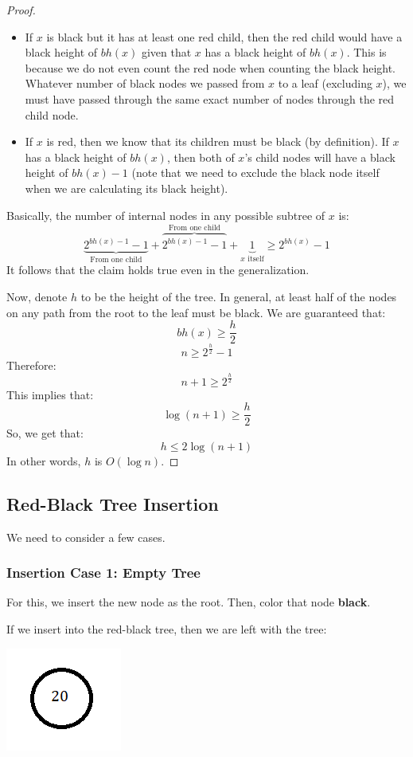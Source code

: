 \documentclass[letterpaper]{article}
\begin{document}
\begin{mdframed}
\begin{proof}
\begin{itemize}
\begin{itemize}
                \item If $x$ is black but it has at least one red child, then the red child would have a black height of $bh(x)$ given that $x$ has a black height of $bh(x)$. This is because we do not even count the red node when counting the black height. Whatever number of black nodes we passed from $x$ to a leaf (excluding $x$), we must have passed through the same exact number of nodes through the red child node.
                \item If $x$ is red, then we know that its children must be black (by definition). If $x$ has a black height of $bh(x)$, then both of $x$'s child nodes will have a black height of $bh(x) - 1$ (note that we need to exclude the black node itself when we are calculating its black height). 
            \end{itemize}
            Basically, the number of internal nodes in any possible subtree of $x$ is:
            \[\underbrace{2^{bh(x) - 1} - 1}_{\text{From one child}} + \overbrace{2^{bh(x) - 1} - 1}^{\text{From one child}} + \underbrace{1}_{x \text{ itself}} \geq 2^{bh(x)} - 1\]
            It follows that the claim holds true even in the generalization.  
        \end{itemize}
        Now, denote $h$ to be the height of the tree. In general, at least half of the nodes on any path from the root to the leaf must be black. We are guaranteed that: 
        \[bh(x) \geq \frac{h}{2}\]
        \[n \geq 2^{\frac{h}{2}} - 1\]
        Therefore: 
        \[n + 1 \geq 2^{\frac{h}{2}}\]
        This implies that: 
        \[\log(n + 1) \geq \frac{h}{2}\]
        So, we get that: 
        \[h \leq 2 \log(n + 1)\]
        In other words, $h$ is $O(\log n)$. 
    \end{proof}
\end{mdframed}

\subsection{Red-Black Tree Insertion}
We need to consider a few cases. 

\subsubsection{Insertion Case 1: Empty Tree}
For this, we insert the new node as the root. Then, color that node \textbf{black}. 

\bigskip 

If we insert  into the red-black tree, then we are left with the tree: 
\begin{center}
    \includegraphics[scale=0.6]{img/init_rb.png}
\end{center}
\end{document}
